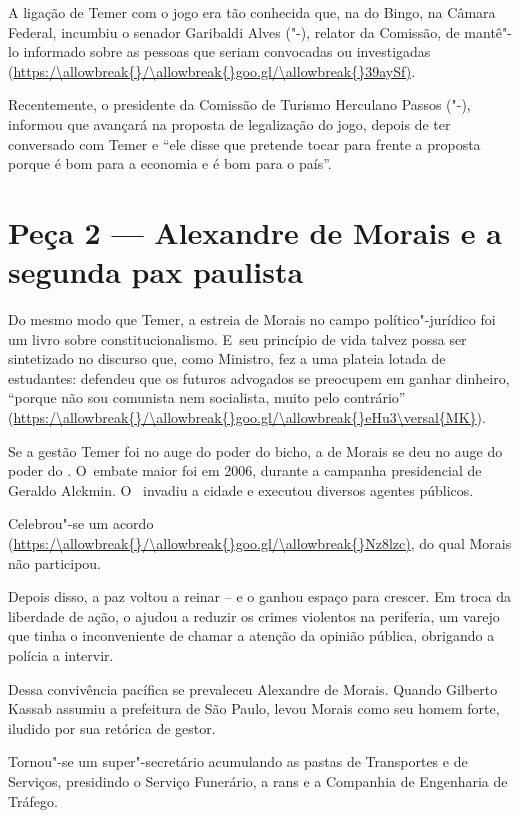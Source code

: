 A ligação de Temer com o jogo era tão conhecida que, na  do Bingo, na
Câmara Federal, incumbiu o senador Garibaldi Alves ("-), relator da
Comissão, de mantê"-lo informado sobre as pessoas que seriam convocadas
ou investigadas (\url{https:/\allowbreak{}/\allowbreak{}goo.gl/\allowbreak{}39aySf)}.

Recentemente, o presidente da Comissão de Turismo Herculano Passos
("-), informou que avançará na proposta de legalização do jogo,
depois de ter conversado com Temer e ``ele disse que pretende tocar para
frente a proposta porque é bom para a economia e é bom para o país''.

\section{Peça 2 --- Alexandre de Morais e a segunda pax paulista}

Do mesmo modo que Temer, a estreia de Morais no campo político"-jurídico
foi um livro sobre constitucionalismo. E~seu princípio de vida talvez
possa ser sintetizado no discurso que, como Ministro, fez a uma plateia
lotada de estudantes: defendeu que os futuros advogados se preocupem em
ganhar dinheiro, ``porque não sou comunista nem socialista, muito pelo
contrário'' (\url{https:/\allowbreak{}/\allowbreak{}goo.gl/\allowbreak{}eHu3\versal{MK}}).

Se a gestão Temer foi no auge do poder do bicho, a de Morais se deu no
auge do poder do . O~embate maior foi em 2006, durante a campanha
presidencial de Geraldo Alckmin. O~ invadiu a cidade e executou
diversos agentes públicos.

Celebrou"-se um acordo (\url{https:/\allowbreak{}/\allowbreak{}goo.gl/\allowbreak{}Nz8lzc)}, do qual Morais não
participou.

Depois disso, a paz voltou a reinar -- e o  ganhou espaço para
crescer. Em troca da liberdade de ação, o  ajudou a reduzir os crimes
violentos na periferia, um varejo que tinha o inconveniente de chamar a
atenção da opinião pública, obrigando a polícia a intervir.

Dessa convivência pacífica se prevaleceu Alexandre de Morais. Quando
Gilberto Kassab assumiu a prefeitura de São Paulo, levou Morais como seu
homem forte, iludido por sua retórica de gestor.

Tornou"-se um super"-secretário acumulando as pastas de Transportes e de
Serviços, presidindo o Serviço Funerário, a rans e a Companhia de
Engenharia de Tráfego.

